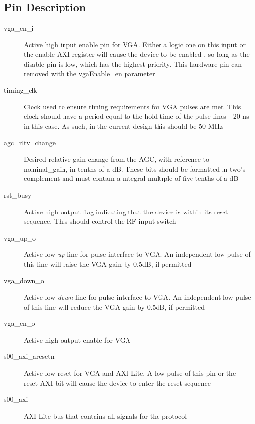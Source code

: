 \documentclass[11pt]{article}
\begin{document}
\subsection{Pin Description}
\begin{description}
	\item[vga\_en\_i]Active high input enable pin for VGA. Either a logic one on this input or the enable AXI register will cause the device to be enabled
		, so long as the disable pin is low, which has the highest priority. This hardware pin can removed with the vgaEnable\_en parameter
	\item[timing\_clk]Clock used to ensure timing requirements for VGA pulses are met. This clock should have a period equal to the hold time of the pulse
		lines - 20 ns in this case. As such, in the current design this should be 50 MHz
	\item[agc\_rltv\_change]Desired relative gain change from the AGC, with reference to nominal\_gain, in tenths of a dB. These bits should be formatted
		in two's complement and must contain a integral multiple of five tenths of a dB
	\item[rst\_busy]Active high output flag indicating that the device is within its reset sequence. This should control the RF input switch
	\item[vga\_up\_o]Active low \textit{up} line for pulse interface to VGA. An independent low pulse of this line will raise the VGA gain by 0.5dB, if
		permitted
	\item[vga\_down\_o]Active low \textit{down} line for pulse interface to VGA. An independent low pulse of this line will reduce the VGA gain by 0.5dB,
		if permitted
	\item[vga\_en\_o]Active high output enable for VGA
	\item[s00\_axi\_aresetn]Active low reset for VGA and AXI-Lite. A low pulse of this pin or the reset AXI bit will cause the device to enter the reset
		sequence
	\item[s00\_axi]AXI-Lite bus that contains all signals for the protocol
\end{description}
\end{document}
